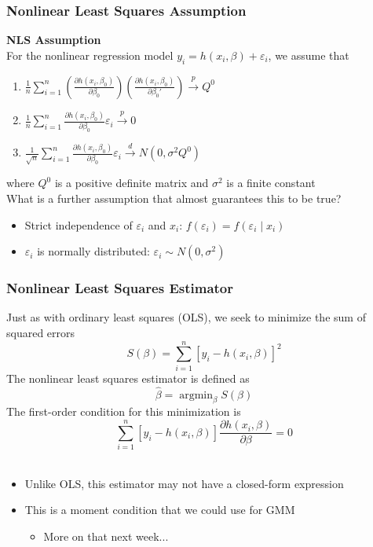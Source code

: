 \documentclass{beamer}
\DeclareMathOperator*{\argmin}{argmin}
\begin{document}
\begin{frame}\frametitle{Nonlinear Least Squares Assumption}
    \textbf{NLS Assumption} \\
    \vspace{3ex}
    For the nonlinear regression model $y_i = h(x_i, \beta) + \varepsilon_i$, we assume that
    \begin{enumerate}
    	\item $\frac{1}{n} \sum_{i = 1}^n \left( \frac{\partial h(x_i, \beta_0)}{\partial \beta_0} \right) \left( \frac{\partial h(x_i, \beta_0)}{\partial \beta_0'} \right) \overset{p}{\rightarrow} Q^0$
    	\item $\frac{1}{n} \sum_{i = 1}^n \frac{\partial h(x_i, \beta_0)}{\partial \beta_0} \varepsilon_i \overset{p}{\rightarrow} 0$
    	\item $\frac{1}{\sqrt{n}} \sum_{i = 1}^n \frac{\partial h(x_i, \beta_0)}{\partial \beta_0} \varepsilon_i \overset{d}{\rightarrow} N(0, \sigma^2 Q^0)$
    \end{enumerate}
    where $Q^0$ is a positive definite matrix and $\sigma^2$ is a finite constant \\
    \vspace{3ex}
    What is a further assumption that almost guarantees this to be true?
    \begin{itemize}
    	\item Strict independence of $\varepsilon_i$ and $x_i$: $f(\varepsilon_i) = f(\varepsilon_i \mid x_i)$
    	\item $\varepsilon_i$ is normally distributed: $\varepsilon_i \sim N(0, \sigma^2)$
    \end{itemize}
\end{frame}

\begin{frame}\frametitle{Nonlinear Least Squares Estimator}
    Just as with ordinary least squares (OLS), we seek to minimize the sum of squared errors
    $$S(\beta) = \sum_{i = 1}^n [y_i - h(x_i, \beta)]^2$$
    The nonlinear least squares estimator is defined as
    $$\hat{\beta} = \argmin_{\beta} S(\beta)$$
    The first-order condition for this minimization is
    $$\sum_{i = 1}^n [y_i - h(x_i, \beta)] \frac{\partial h(x_i, \beta)}{\partial \beta} = 0$$ \\
    \begin{itemize}
    	\item Unlike OLS, this estimator may not have a closed-form expression
    	\item This is a moment condition that we could use for GMM
    	\begin{itemize}
    		\item More on that next week...
    	\end{itemize}
    \end{itemize}
\end{frame}
\end{document}
